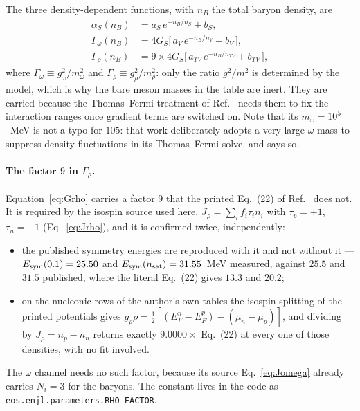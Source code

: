 \documentclass[aps,prc,onecolumn,superscriptaddress,nofootinbib,10pt]{revtex4-2}
\newcommand{\nB}{n_B}
\begin{document}
The three density-dependent functions, with $\nB$ the total baryon density,
are
%
\begin{align}
\alpha_S(\nB)      &= a_S\, e^{-\nB/n_S} + b_S ,
\label{eq:alphaS}\\
\Gamma_\omega(\nB) &= 4 G_S \big[\, a_V\, e^{-\nB/n_V} + b_V \,\big] ,
\label{eq:Gomega}\\
\Gamma_\rho(\nB)   &= 9 \times 4 G_S
                      \big[\, a_{TV}\, e^{-\nB/n_{TV}} + b_{TV} \,\big] ,
\label{eq:Grho}
\end{align}
%
where $\Gamma_\omega \equiv g_\omega^2/m_\omega^2$ and
$\Gamma_\rho \equiv g_\rho^2/m_\rho^2$: only the ratio $g^2/m^2$ is determined
by the model, which is why the bare meson masses in the table are inert. They
are carried because the Thomas--Fermi treatment of
Ref.~\cite{XiaMaruyamaYasutakeTatsumi2024} needs them to fix the interaction
ranges once gradient terms are switched on. Note that its
$m_\omega = 10^5$~MeV is not a typo for $105$: that work deliberately adopts a
very large $\omega$ mass to suppress density fluctuations in its Thomas--Fermi
solve, and says so.

\paragraph{The factor $9$ in $\Gamma_\rho$.} Equation~\eqref{eq:Grho} carries a
factor $9$ that the printed Eq.~(22) of Ref.~\cite{Xia2024} does not. It is
required by the isospin source used here, $J_\rho = \sum_i f_i \tau_i n_i$
with $\tau_p = +1$, $\tau_n = -1$ (Eq.~\ref{eq:Jrho}), and it is confirmed
twice, independently:
%
\begin{itemize}
\item the published symmetry energies are reproduced with it and not without
  it --- $E_{\rm sym}(0.1) = 25.50$ and $E_{\rm sym}(n_{\rm sat}) = 31.55$~MeV
  measured, against $25.5$ and $31.5$ published, where the literal Eq.~(22)
  gives $13.3$ and $20.2$;
\item on the nucleonic rows of the author's own tables the isospin splitting
  of the printed potentials gives
  $g_\rho\rho = \tfrac12[(E_F^n - E_F^p) - (\mu_n - \mu_p)]$, and dividing by
  $J_\rho = n_p - n_n$ returns exactly $9.0000\times$ Eq.~(22) at every one of
  those densities, with no fit involved.
\end{itemize}
%
The $\omega$ channel needs no such factor, because its source
Eq.~\eqref{eq:Jomega} already carries $N_i = 3$ for the baryons. The
constant lives in the code as \texttt{eos.enjl.parameters.RHO\_FACTOR}.
\end{document}
